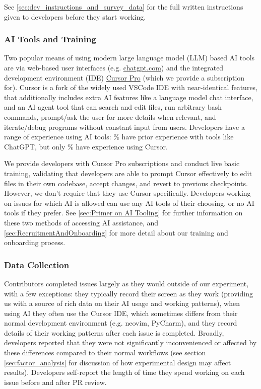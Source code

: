 \documentclass{article}
\begin{document}
See \autoref{sec:dev_instructions_and_survey_data} for the full written instructions given to developers before they start working.

\subsubsection{AI Tools and Training}

Two popular means of using modern large language model (LLM) based AI tools are via web-based user interfaces (e.g. \href{https://chatgpt.com}{chatgpt.com}) and the integrated development environment (IDE) \href{https://www.cursor.com/}{Cursor Pro} (which we provide a subscription for). 
Cursor is a fork of the widely used VSCode IDE with near-identical features, that additionally includes extra AI features like a language model chat interface, and an AI agent tool that can search and edit files, run arbitrary bash commands, prompt/ask the user for more details when relevant, and iterate/debug programs without constant input from users. Developers have a range of experience using AI tools: \PctDevsPreviouslyUsedWebLLM\% have prior experience with tools like ChatGPT, but only \PctDevelopersPreviouslyUsedCursor\% have experience using Cursor.

We provide developers with Cursor Pro subscriptions and conduct live basic training, validating that developers are able to prompt Cursor effectively to edit files in their own codebase, accept changes, and revert to previous checkpoints. However, we don't require that they use Cursor specifically. Developers working on issues for which AI is allowed can use any AI tools of their choosing, or no AI tools if they prefer.
See \autoref{sec:Primer on AI Tooling} for further information on these two methods of accessing AI assistance, and \autoref{sec:RecruitmentAndOnboarding} for more detail about our training and onboarding process.


\subsubsection{Data Collection}

Contributors completed issues largely as they would outside of our experiment, with a few exceptions: they typically record their screen as they work (providing us with a source of rich data on their AI usage and working patterns), when using AI they often use the Cursor IDE, which sometimes differs from their normal development environment (e.g. neovim, PyCharm), and they record details of their working patterns after each issue is completed. Broadly, developers reported that they were not significantly inconvenienced or affected by these differences compared to their normal workflows (see section \autoref{sec:factor_analysis} for discussion of how experimental design may affect results). Developers self-report the length of time they spend working on each issue before and after PR review.
\end{document}
